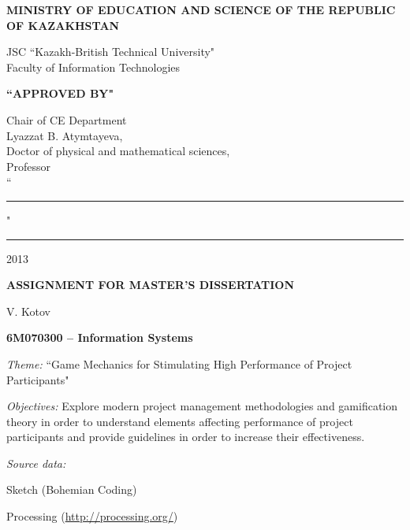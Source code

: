 \begin{titlepage}
	\pagebreak


	\begin{center}
	{\bf{\MakeUppercase{Ministry of education and science of the republic of Kazakhstan}}

		\vspace{14pt}

		JSC ``Kazakh-British Technical University"\\
		Faculty of Information Technologies}

		\vspace{14pt}
		
		\begin{flushright}
			{\bf \MakeUppercase{``Approved by"}}

			Chair of CE Department\\
			Lyazzat B. Atymtayeva,\\
			Doctor of physical and mathematical sciences,\\
			Professor\\

			\vspace{0.5\baselineskip}
			``\rule{2em}{0.4pt}" \rule{8em}{0.4pt} 2013\\
		    \end{flushright}
		
		{\bf
		\MakeUppercase{Assignment for master's dissertation}}

	\end{center}

	\setlength{\parindent}{0pt}
	\setlength{\parskip}{1ex plus 0.5ex minus 0.2ex}

	V. Kotov

	{\bf 6M070300 -- Information Systems}

	\emph{Theme:} ``Game Mechanics for Stimulating High Performance of Project Participants"
    
   \emph{Objectives:}
	Explore modern project management methodologies and gamification theory in order to understand elements affecting performance of project participants and provide guidelines in order to increase their effectiveness.
	
	\emph{Source data:}
	
	\begin{compactitem}
	\item Sketch (Bohemian Coding)
	\item Processing (\url{http://processing.org/})
	\end{compactitem}



\end{titlepage}

